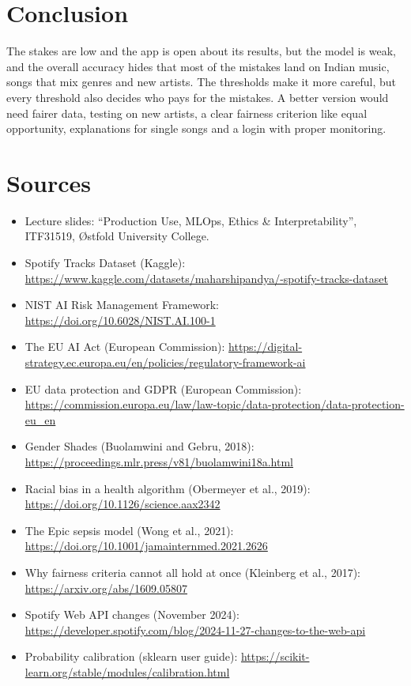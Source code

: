 \documentclass[11pt,a4paper]{article}
\begin{document}
\section{Conclusion}

The stakes are low and the app is open about its results, but the model is weak, and the overall accuracy hides that most of the mistakes land on Indian music, songs that mix genres and new artists. The thresholds make it more careful, but every threshold also decides who pays for the mistakes. A better version would need fairer data, testing on new artists, a clear fairness criterion like equal opportunity, explanations for single songs and a login with proper monitoring.

\section{Sources}

{\footnotesize
\begin{itemize}[itemsep=1pt,topsep=2pt]
  \item Lecture slides: \enquote{Production Use, MLOps, Ethics \& Interpretability}, ITF31519, {\O}stfold University College.
  \item Spotify Tracks Dataset (Kaggle): \url{https://www.kaggle.com/datasets/maharshipandya/-spotify-tracks-dataset}
  \item NIST AI Risk Management Framework: \url{https://doi.org/10.6028/NIST.AI.100-1}
  \item The EU AI Act (European Commission): \url{https://digital-strategy.ec.europa.eu/en/policies/regulatory-framework-ai}
  \item EU data protection and GDPR (European Commission): \url{https://commission.europa.eu/law/law-topic/data-protection/data-protection-eu_en}
  \item Gender Shades (Buolamwini and Gebru, 2018): \url{https://proceedings.mlr.press/v81/buolamwini18a.html}
  \item Racial bias in a health algorithm (Obermeyer et al., 2019): \url{https://doi.org/10.1126/science.aax2342}
  \item The Epic sepsis model (Wong et al., 2021): \url{https://doi.org/10.1001/jamainternmed.2021.2626}
  \item Why fairness criteria cannot all hold at once (Kleinberg et al., 2017): \url{https://arxiv.org/abs/1609.05807}
  \item Spotify Web API changes (November 2024): \url{https://developer.spotify.com/blog/2024-11-27-changes-to-the-web-api}
  \item Probability calibration (sklearn user guide): \url{https://scikit-learn.org/stable/modules/calibration.html}
\end{itemize}}
\end{document}

